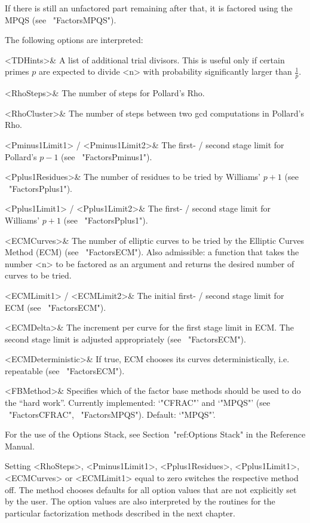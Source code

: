 If there is still an unfactored part remaining after that,
it is factored using the MPQS (see ~"FactorsMPQS").

The following options are interpreted:

\beginitems
   <TDHints>& A list of additional trial divisors.
   This is useful only if certain primes $p$ are expected to
   divide <n> with probability significantly larger than 
   $\frac{1}{p}$.

   <RhoSteps>& The number of steps for Pollard's Rho.

   <RhoCluster>& The number of steps between two
   gcd computations in Pollard's Rho.

   <Pminus1Limit1> / <Pminus1Limit2>& The first- / second stage
   limit for Pollard's $p-1$ (see ~"FactorsPminus1").

   <Pplus1Residues>& The number of residues to be tried
   by Williams' $p+1$ (see ~"FactorsPplus1").

   <Pplus1Limit1> / <Pplus1Limit2>& The first- / second stage
   limit for Williams' $p+1$ (see ~"FactorsPplus1").

   <ECMCurves>& The number of elliptic curves to be tried by the
   Elliptic Curves Method (ECM) (see ~"FactorsECM").
   Also admissible: a function that takes the number <n> to be
   factored as an argument and returns the desired number
   of curves to be tried.

   <ECMLimit1> / <ECMLimit2>& The initial first- / second stage
   limit for ECM (see ~"FactorsECM").

   <ECMDelta>& The increment per curve for the first stage limit
   in ECM. The second stage limit is adjusted appropriately
   (see ~"FactorsECM").

   <ECMDeterministic>& If true, ECM chooses its curves 
   deterministically, i.e. repeatable (see ~"FactorsECM").

   <FBMethod>& Specifies which of the factor base methods should be
   used to do the ``hard work''. Currently implemented: `"CFRAC"'
   and `"MPQS"' (see ~"FactorsCFRAC", ~"FactorsMPQS"). Default: `"MPQS"'.
\enditems

For the use of the {\GAP} Options Stack, see Section~"ref:Options Stack"
in the {\GAP} Reference Manual.

Setting <RhoSteps>, <Pminus1Limit1>, <Pplus1Residues>, <Pplus1Limit1>,
<ECMCurves> or <ECMLimit1> equal to zero switches the respective method
off. The method chooses defaults for all option values that are not
explicitly set by the user. The option values are also interpreted by
the routines for the particular factorization methods described in the
next chapter.

